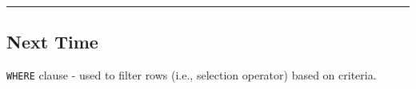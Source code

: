 \documentclass{article}
\begin{document}
 \hspace{-0.5cm}\rule[-0.101in]{\textwidth}{0.0025in}










\subsection*{Next Time}
 \texttt{WHERE} clause - used to filter rows (i.e., selection operator) based on criteria.
 
 

  



 
\end{document}
